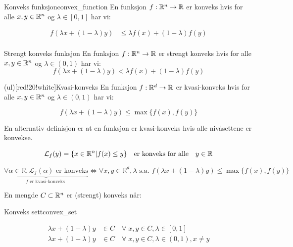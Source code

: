 \documentclass[11pt, a4paper]{article}
\begin{document}
\begin{definition}{Konveks funksjon}{convex_function}
  En funksjon $f: \mathbb{R}^n \to \mathbb{R}$ er konveks hvis for alle $x, y \in \mathbb{R}^n$ og $\lambda \in [0, 1]$ har vi:

  \begin{align*}
    f(\lambda x + (1 - \lambda)y) & \leq \lambda f(x) + (1 - \lambda)f(y) \tag{Konveks} \\
  \end{align*}

  \begin{filingbox}{Strengt konveks funksjon}
    En funksjon $f: \mathbb{R}^n \to \mathbb{R}$ er strengt konveks hvis for alle $x, y \in \mathbb{R}^n$ og $\lambda \in (0, 1)$ har vi:
    \[
      f(\lambda x + (1 - \lambda)y) < \lambda f(x) + (1 - \lambda)f(y)
    \]\label{def:strictly_convex}
  \end{filingbox}
  \begin{filingbox}(ul)[red!20!white]{Kvasi-konveks}
    En funksjon $f: \mathbb{R}^d \to \mathbb{R}$ er kvasi-konveks hvis for alle $x, y \in \mathbb{R}^n$ og $\lambda \in (0, 1)$ har vi:

    \[
      f(\lambda x + (1 - \lambda)y) \leq \max\{f(x), f(y)\}
    \]

    En alternativ definisjon er at en funksjon er kvasi-konveks hvis alle nivåsettene er konvekse.

    \[
      \mathcal{L}_f(y) = \{x \in \mathbb{R}^n | f(x) \leq y\} \quad \text{er konveks for alle} \quad y \in \mathbb{R}
    \]

    \[
      \boxed{\underbrace{\forall \alpha \in \mathbb{R}, \mathcal{L}_f(\alpha) \text{ er konveks}}_{f \text{ er kvasi-konveks }}\Longleftrightarrow \forall x, y \in \mathbb{R}^d,\lambda \text{ s.a. } f(\lambda x + (1-\lambda)y) \leq \max \{ f(x), f(y) \}}
    \]
  \end{filingbox}\label{def:quasi_convex}

\end{definition}

En mengde $C \subset \mathbb{R}^n$ er (strengt) konveks når:

\begin{definition}{Konveks sett}{convex_set}

  \begin{align*}
    \lambda x + (1 - \lambda)y & \in C \quad \forall \; x, y \in C, \lambda \in [0, 1] \tag{Konveks}                   \\
    \lambda x + (1 - \lambda)y & \in C \quad \forall \; x, y \in C, \lambda \in (0, 1), x \neq y \tag{Strengt konveks}
  \end{align*}

\end{definition}
\end{document}
